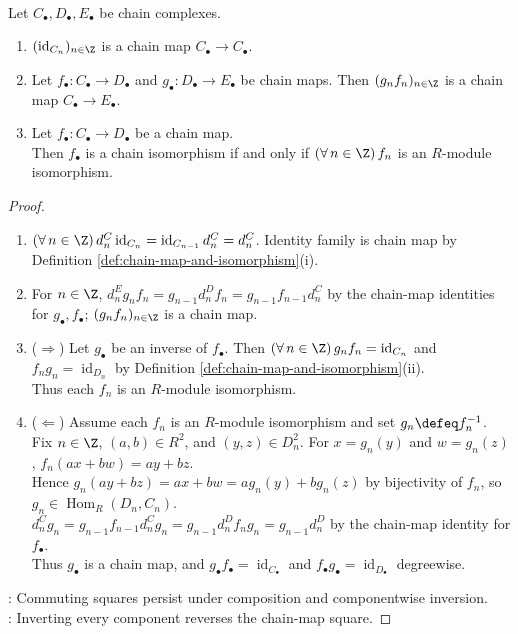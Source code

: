 \begin{proposition} \label{prop:chain-maps-compose-and-invert-degreewise} \\
Let $C_\bullet,D_\bullet,E_\bullet$ be chain complexes.
\begin{enumerate}[label=(\roman*)]
\setlength{\itemsep}{0pt}
\item $(\operatorname{id}_{C_n})_{n\in\Z}$ is a chain map $C_\bullet\to C_\bullet$.
\item Let $f_\bullet:C_\bullet\to D_\bullet$ and $g_\bullet:D_\bullet\to E_\bullet$ be chain maps. Then $(g_nf_n)_{n\in\Z}$ is a chain map $C_\bullet\to E_\bullet$.
\item Let $f_\bullet:C_\bullet\to D_\bullet$ be a chain map.\\
Then $f_\bullet$ is a chain isomorphism if and only if $(\forall\,n\in\Z)\,f_n$ is an $R$-module isomorphism.
\end{enumerate}
\begin{proof}
\begin{enumerate}[label=(\roman*)]
\setlength{\itemsep}{0pt}
\item[$(i)$] $(\forall\,n\in\Z)\,d^C_n\operatorname{id}_{C_n}=\operatorname{id}_{C_{n-1}}d^C_n=d^C_n$. Identity family is chain map by Definition \ref{def:chain-map-and-isomorphism}(i).
\item[$(ii)$] For $n\in\Z$, $d^E_ng_nf_n=g_{n-1}d^D_nf_n=g_{n-1}f_{n-1}d^C_n$ by the chain-map identities for $g_\bullet,f_\bullet$; $(g_nf_n)_{n\in\Z}$ is a chain map.
\item[$(iii)$] ($\Rightarrow$) Let $g_\bullet$ be an inverse of $f_\bullet$. Then $(\forall\,n\in\Z)\,g_nf_n=\operatorname{id}_{C_n}$ and $f_ng_n=\operatorname{id}_{D_n}$ by Definition \ref{def:chain-map-and-isomorphism}(ii).\\
Thus each $f_n$ is an $R$-module isomorphism.
\item[$(iii)$] ($\Leftarrow$) Assume each $f_n$ is an $R$-module isomorphism and set $g_n\defeq f_n^{-1}$.\\
Fix $n\in\Z$, $(a,b)\in R^2$, and $(y,z)\in D_n^2$. For $x=g_n(y)$ and $w=g_n(z)$, $f_n(ax+bw)=ay+bz$.\\
Hence $g_n(ay+bz)=ax+bw=ag_n(y)+bg_n(z)$ by bijectivity of $f_n$, so $g_n\in\operatorname{Hom}_R(D_n,C_n)$.\\
$d^C_ng_n=g_{n-1}f_{n-1}d^C_ng_n=g_{n-1}d^D_nf_ng_n=g_{n-1}d^D_n$ by the chain-map identity for $f_\bullet$.\\
Thus $g_\bullet$ is a chain map, and $g_\bullet f_\bullet=\operatorname{id}_{C_\bullet}$ and $f_\bullet g_\bullet=\operatorname{id}_{D_\bullet}$ degreewise.
\end{enumerate}
: Commuting squares persist under composition and componentwise inversion.\\
: Inverting every component reverses the chain-map square.
\end{proof}
\end{proposition}

